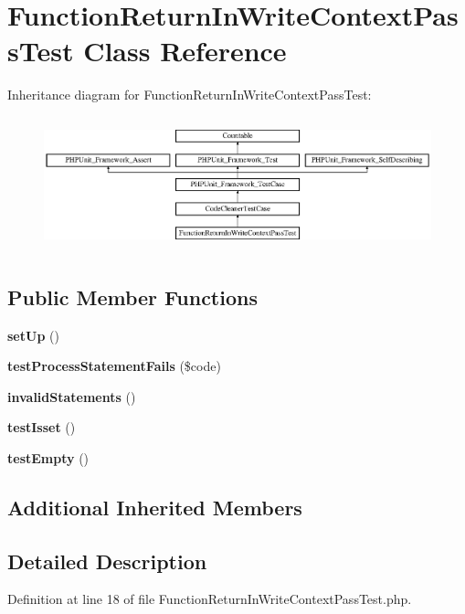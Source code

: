 \section{Function\+Return\+In\+Write\+Context\+Pass\+Test Class Reference}
\label{class_psy_1_1_test_1_1_code_cleaner_1_1_function_return_in_write_context_pass_test}
Inheritance diagram for Function\+Return\+In\+Write\+Context\+Pass\+Test\+:\begin{figure}[H]
\begin{center}
\leavevmode
\includegraphics[height=3.938116cm]{class_psy_1_1_test_1_1_code_cleaner_1_1_function_return_in_write_context_pass_test}
\end{center}
\end{figure}
\subsection*{Public Member Functions}
\begin{DoxyCompactItemize}
\item 
{\bf set\+Up} ()
\item 
{\bf test\+Process\+Statement\+Fails} (\$code)
\item 
{\bf invalid\+Statements} ()
\item 
{\bf test\+Isset} ()
\item 
{\bf test\+Empty} ()
\end{DoxyCompactItemize}
\subsection*{Additional Inherited Members}


\subsection{Detailed Description}


Definition at line 18 of file Function\+Return\+In\+Write\+Context\+Pass\+Test.\+php.



